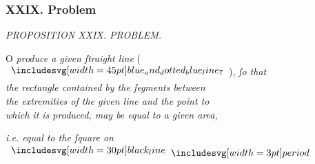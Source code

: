 \documentclass[12pt,preview]{standalone}
\begin{document}
\subsubsection{XXIX. Problem}

\begin{minipage}[t]{0.64\textwidth}
    \vspace{0pt}

    \begin{center}
        \textit{PROPOSITION XXIX. PROBLEM.}\label{book6pr29} \\
    \end{center}

    \hfill

    \begin{center}
        \raggedright \lettrine[lines=4, loversize=1, nindent=0pt]{}{}O \textit{produce a given ſtraight line} (\hspace{-1ex}$\bimg{blue_and_dotted_blue_line_7}$\hspace{-1ex}), \textit{ſo that\\ the rectangle contained by the ſegments between\\ the extremities of the given line and the point to\\ which it is produced, may be equal to a given area,}
    \end{center}
    \textit{i.e. equal to the ſquare on} $\blackline \bperiod$

    \hfill

    \hfill


\end{minipage}
\end{document}
